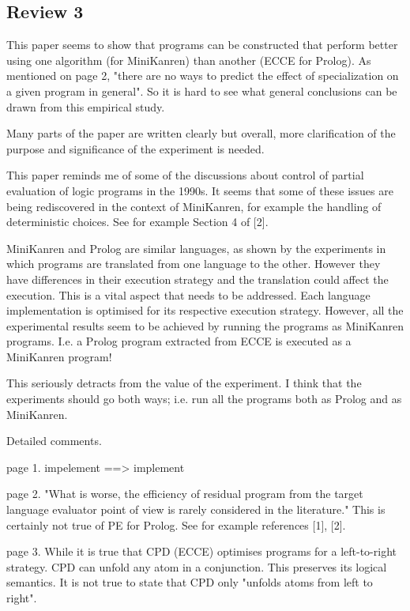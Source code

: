 \subsection*{Review 3}

This paper seems to show that programs can be constructed that perform better using one algorithm (for MiniKanren) than another (ECCE for Prolog).  As mentioned on page 2, "there are no ways to predict the effect of specialization on a given program in general".  So it is hard to see what general conclusions can be drawn from this empirical study.

Many parts of the paper are written clearly but overall, more clarification of the purpose and significance of the experiment is needed.

This paper reminds me of some of the discussions about control of partial evaluation of logic programs in the 1990s.  It seems that some of these issues are being rediscovered in the context of MiniKanren, for example the handling of deterministic choices.  See for example Section 4 of [2].

MiniKanren and Prolog are similar languages, as shown by the experiments in which programs are translated from one language to the other.  However they have differences in their execution strategy and the translation could affect the execution.  This is a vital aspect that needs to be addressed.  Each language implementation is optimised for its respective execution strategy. However, all the experimental results seem to be achieved by running the programs as MiniKanren programs.  I.e. a Prolog program extracted from ECCE is executed as a MiniKanren program!


This seriously detracts from the value of the experiment. I think that the experiments should go both ways; i.e. run all the programs both as Prolog and as MiniKanren.



Detailed comments.

page 1. impelement ==> implement

page 2.  "What is worse, the efficiency of residual program from the target language evaluator point of view is rarely considered in the literature." This is certainly not true of PE for Prolog.  See for example references [1], [2].

page 3.  While it is true that CPD (ECCE) optimises programs for a left-to-right strategy. CPD can unfold any atom in a conjunction.  This preserves its logical semantics.  It is not true to state that CPD only "unfolds atoms from left to right".

